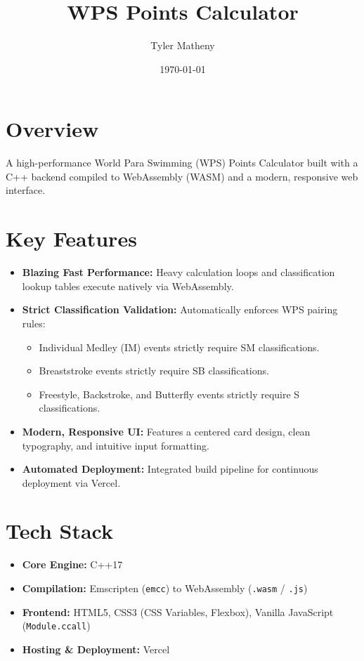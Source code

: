 \documentclass[11pt]{article}
\title{\textbf{WPS Points Calculator}}
\author{Tyler Matheny}
\date{\today}
\begin{document}
\maketitle

\section{Overview}
A high-performance World Para Swimming (WPS) Points Calculator built with a C++ backend compiled to WebAssembly (WASM) and a modern, responsive web interface.

\section{Key Features}
\begin{itemize}
    \item \textbf{Blazing Fast Performance:} Heavy calculation loops and classification lookup tables execute natively via WebAssembly.
    \item \textbf{Strict Classification Validation:} Automatically enforces WPS pairing rules:
    \begin{itemize}
        \item Individual Medley (IM) events strictly require SM classifications.
        \item Breaststroke events strictly require SB classifications.
        \item Freestyle, Backstroke, and Butterfly events strictly require S classifications.
    \end{itemize}
    \item \textbf{Modern, Responsive UI:} Features a centered card design, clean typography, and intuitive input formatting.
    \item \textbf{Automated Deployment:} Integrated build pipeline for continuous deployment via Vercel.
\end{itemize}

\section{Tech Stack}
\begin{itemize}
    \item \textbf{Core Engine:} C++17
    \item \textbf{Compilation:} Emscripten (\texttt{emcc}) to WebAssembly (\texttt{.wasm} / \texttt{.js})
    \item \textbf{Frontend:} HTML5, CSS3 (CSS Variables, Flexbox), Vanilla JavaScript (\texttt{Module.ccall})
    \item \textbf{Hosting \& Deployment:} Vercel
\end{itemize}
\end{document}
